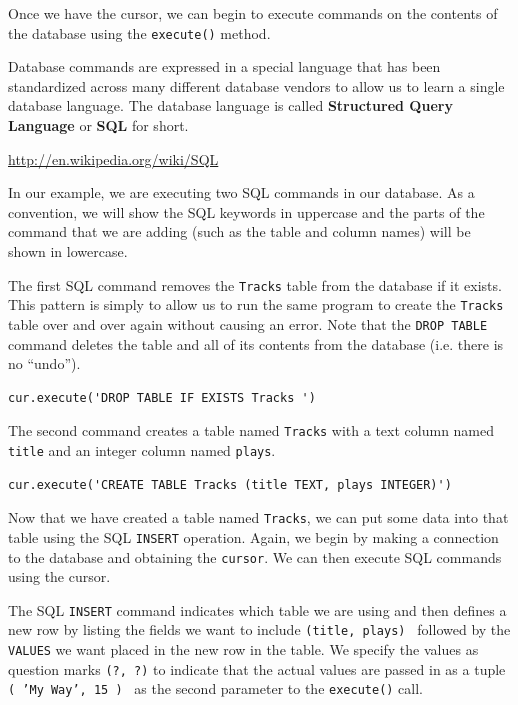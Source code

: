 \documentclass[11pt]{book}
\begin{document}
Once we have the cursor, we can begin to execute 
commands on the contents of the database using the {\tt execute()}
method.

Database commands are expressed in a special language that has 
been standardized across many different database vendors 
to allow us to learn a single database language.   The database
language is called {\bf Structured Query Language} or {\bf SQL}
for short.

\url{http://en.wikipedia.org/wiki/SQL}

In our example, we are executing two SQL commands in our database.
As a convention, we will show the SQL keywords in uppercase 
and the parts of the command that we are adding (such as the
table and column names) will be shown in lowercase.

The first SQL command removes the {\tt Tracks} table from the 
database if it exists.  This pattern is simply to allow us to 
run the same program to create the {\tt Tracks} table over 
and over again without causing an error.  Note that the
{\tt DROP TABLE} command deletes the table and all of its contents
from the database (i.e. there is no ``undo'').

\beforeverb
\begin{verbatim}
cur.execute('DROP TABLE IF EXISTS Tracks ')
\end{verbatim}
\afterverb
%
The second command creates a table named
{\tt Tracks} with a text column named {\tt title}
and an integer column named {\tt plays}.

\beforeverb
\begin{verbatim}
cur.execute('CREATE TABLE Tracks (title TEXT, plays INTEGER)')
\end{verbatim}
\afterverb
%
Now that we have created a table named {\tt Tracks}, we can put some data
into that table using the SQL {\tt INSERT} operation.   Again, we begin
by making a connection to the database and obtaining the {\tt cursor}.
We can then execute SQL commands using the cursor.

The SQL {\tt INSERT} command indicates which table we are using 
and then defines a new row by listing the fields we want to 
include {\tt (title, plays) } followed by the {\tt VALUES} we want
placed in the new row in the table.   We specify the values
as question marks {\tt (?, ?)} to indicate that the actual 
values are passed in as a tuple {\tt ( 'My Way', 15 ) } as the
second parameter to the {\tt execute()} call.
\end{document}
